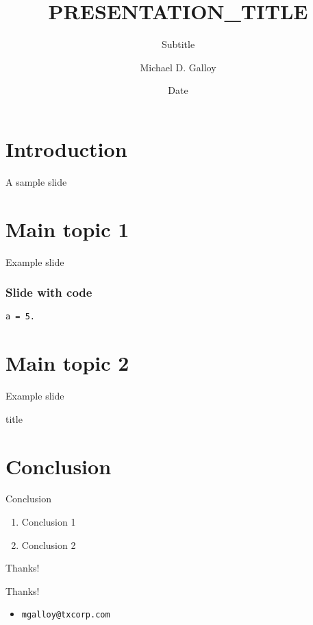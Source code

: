 \documentclass{beamer}
\title{PRESENTATION_TITLE}
\subtitle{Subtitle}
\author{Michael D. Galloy}
\institute[Tech-X Corporation]{}
\date{Date}
\begin{document}
\begin{frame}[plain]
  \titlepage
\end{frame}


\section{Introduction}


\begin{frame}{A sample slide}
\end{frame}


\section{Main topic 1}


\begin{frame}{Example slide}
\end{frame}

\begin{frame}[fragile]
  \frametitle{Slide with code}
  \begin{lstlisting}a = 5.
  \end{lstlisting}
\end{frame}


\section{Main topic 2}


\begin{frame}{Example slide}
\end{frame}

\begin{frame}{title}
\end{frame}


\section{Conclusion}


\begin{frame}{Conclusion}
  \begin{enumerate}
    \item Conclusion 1
    \item Conclusion 2
  \end{enumerate}
\end{frame}

\begin{frame}{Thanks!}
  \begin{center}{\huge Thanks!}\end{center}
  \begin{itemize}
    \item {\tt mgalloy@txcorp.com}
  \end{itemize}
\end{frame}
\end{document}
